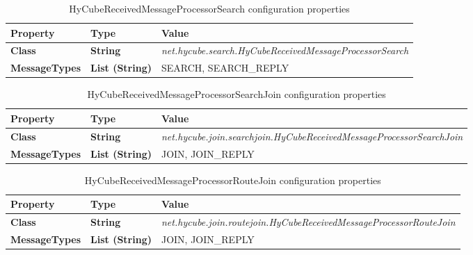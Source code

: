 \begin{table}
\scriptsize
\begin{center}
\begin{tabular}{p{4.5cm} p{1.5cm} p{8.5cm}}
	\hline
	\textbf{Property}							& \textbf{Type}					& \textbf{Value}					\\[1mm]
    \hline
	\textbf{Class}								& \textbf{String}				& \textit{net.hycube.search.HyCubeReceivedMessageProcessorSearch}									\\[1.5mm]	
	\textbf{MessageTypes}						& \textbf{List (String)}		& SEARCH, SEARCH\_REPLY																				\\[1.5mm]	
    \hline
\end{tabular}
\end{center}
\caption{HyCubeReceivedMessageProcessorSearch configuration properties}
\label{tab:libHyCubeReceivedMessageProcessorSearch}
\end{table}


\begin{table}
\scriptsize
\begin{center}
\begin{tabular}{p{4.5cm} p{1.5cm} p{8.5cm}}
	\hline
	\textbf{Property}							& \textbf{Type}					& \textbf{Value}					\\[1mm]
    \hline
	\textbf{Class}								& \textbf{String}				& \textit{net.hycube.join.searchjoin.HyCubeReceivedMessageProcessorSearchJoin}					\\[1.5mm]	
	\textbf{MessageTypes}						& \textbf{List (String)}		& JOIN, JOIN\_REPLY																				\\[1.5mm]	
    \hline
\end{tabular}
\end{center}
\caption{HyCubeReceivedMessageProcessorSearchJoin configuration properties}
\label{tab:libHyCubeReceivedMessageProcessorSearchJoin}
\end{table}

\begin{table}
\scriptsize
\begin{center}
\begin{tabular}{p{4.5cm} p{1.5cm} p{8.5cm}}
	\hline
	\textbf{Property}							& \textbf{Type}					& \textbf{Value}					\\[1mm]
    \hline
	\textbf{Class}								& \textbf{String}				& \textit{net.hycube.join.routejoin.HyCubeReceivedMessageProcessorRouteJoin}					\\[1.5mm]	
	\textbf{MessageTypes}						& \textbf{List (String)}		& JOIN, JOIN\_REPLY																				\\[1.5mm]	
    \hline
\end{tabular}
\end{center}
\caption{HyCubeReceivedMessageProcessorRouteJoin configuration properties}
\label{tab:libHyCubeReceivedMessageProcessorRouteJoin}
\end{table}


